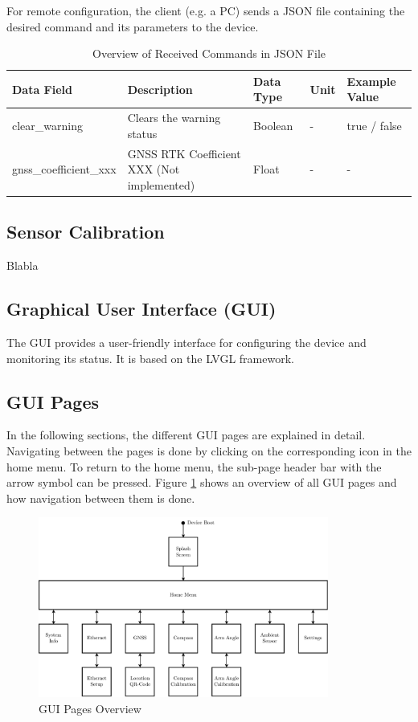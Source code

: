 For remote configuration, the client (e.g. a PC) sends a JSON file containing the desired command and its parameters to the device.

\begin{table}
	\tiny
	\centering
	\begin{tabular}{|l|l|l|l|l|}
		\hline
		\textbf{Data Field}    & \textbf{Description}                       & \textbf{Data Type} & \textbf{Unit} & \textbf{Example Value} \\ \hline
		clear\_warning         & Clears the warning status                  & Boolean            & -             & true / false           \\ \hline
		gnss\_coefficient\_xxx & GNSS RTK Coefficient XXX (Not implemented) & Float              & -             & -                      \\ \hline
	\end{tabular}
	\caption{Overview of Received Commands in JSON File}
	\label{tab:received_commands}
\end{table}

\subsection{Sensor Calibration}
Blabla


\subsection{Graphical User Interface (GUI)}
The GUI provides a user-friendly interface for configuring the device and monitoring its status.
It is based on the LVGL framework.

\newpage
\subsection{GUI Pages}
In the following sections, the different GUI pages are explained in detail.
Navigating between the pages is done by clicking on the corresponding icon in the home menu.
To return to the home menu, the sub-page header bar with the arrow symbol can be pressed.
Figure \ref{fig:gui_pages_overview} shows an overview of all GUI pages and how navigation between them is done.
\begin{figure}[h!]
	\centering
	\vspace{-0.5cm}
	\includegraphics[width=0.85\textwidth]{images/6_design_final/final_design_gui_pages.pdf}
	\caption{GUI Pages Overview}
	\label{fig:gui_pages_overview}
\end{figure}
\vspace{-0.3cm}

